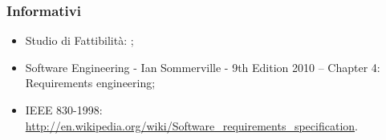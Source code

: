 	\subsubsection{Informativi}
		\begin{itemize}
			\item Studio di Fattibilità: \docNameVersionSdF;
			\item Software Engineering - Ian Sommerville - 9th Edition 2010 – Chapter 4: Requirements engineering;
			\item IEEE 830-1998: \url{http://en.wikipedia.org/wiki/Software_requirements_specification}.
		\end{itemize}